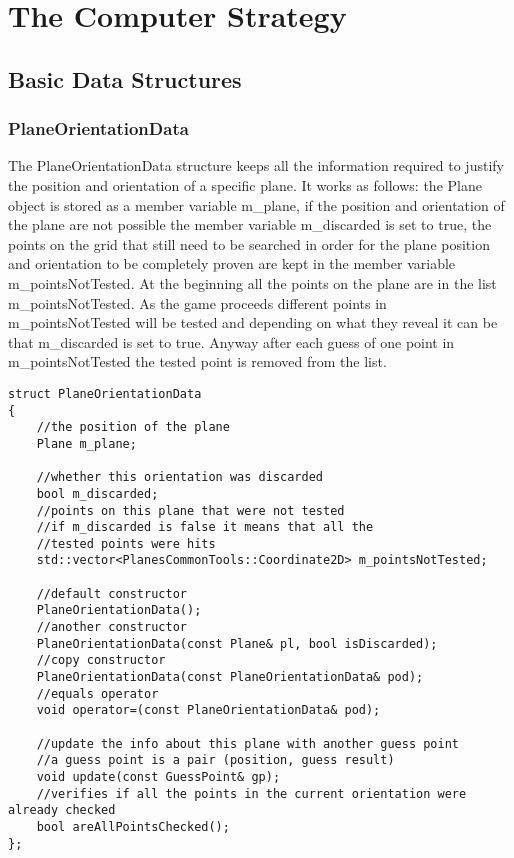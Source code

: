 \section{The Computer Strategy}

\subsection{Basic Data Structures} \label {Strategy_Data_Structures}

\subsubsection{PlaneOrientationData}

The PlaneOrientationData structure keeps all the information required to justify the position and orientation of a specific plane. It works as follows: the Plane object is stored as a member variable m\_plane, if the position and orientation of the plane are not possible the member variable m\_discarded is set to true, the points on the grid that still need to be searched in order for the plane position and orientation to be completely proven are kept in the member variable m\_pointsNotTested. At the beginning all the points on the plane are in the list m\_pointsNotTested. As the game proceeds different points in m\_pointsNotTested will be tested and depending on what they reveal it can be that m\_discarded is set to true. Anyway after each guess of one point in m\_pointsNotTested the tested point is removed from the list. 

\begin{lstlisting}
struct PlaneOrientationData
{
	//the position of the plane
	Plane m_plane;
	
	//whether this orientation was discarded
	bool m_discarded;
	//points on this plane that were not tested
	//if m_discarded is false it means that all the
	//tested points were hits
	std::vector<PlanesCommonTools::Coordinate2D> m_pointsNotTested;
	
	//default constructor
	PlaneOrientationData();
	//another constructor
	PlaneOrientationData(const Plane& pl, bool isDiscarded);
	//copy constructor
	PlaneOrientationData(const PlaneOrientationData& pod);
	//equals operator
	void operator=(const PlaneOrientationData& pod);
	
	//update the info about this plane with another guess point
	//a guess point is a pair (position, guess result)
	void update(const GuessPoint& gp);
	//verifies if all the points in the current orientation were already checked
	bool areAllPointsChecked();
};

\end{lstlisting}


